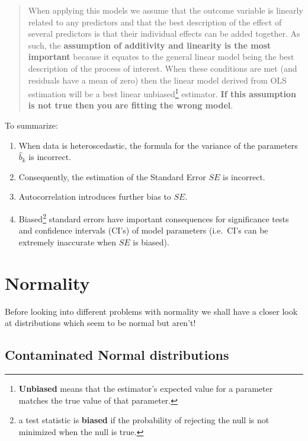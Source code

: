 \documentclass[
]{article}
\providecommand{\tightlist}{%
  \setlength{\itemsep}{0pt}\setlength{\parskip}{0pt}}
\begin{document}
\begin{quote}
When applying this models we assume that the outcome variable is linearly related to any predictors and that the best description of the effect of several predictors is that their individual effects can be added together. As such, the \textbf{assumption of additivity and linearity is the most important} because it equates to the general linear model being the best description of the process of interest. When these conditions are met (and residuals have a mean of zero) then the linear model derived from OLS estimation will be a best linear unbiased\footnote{ \textbf{Unbiased} means that the estimator's expected value for a parameter matches the true value of that parameter.} estimator. \textbf{If this assumption is not true then you are fitting the wrong model}.
\end{quote}

To summarize:

\begin{enumerate}
\def\labelenumi{\arabic{enumi}.}
\tightlist
\item
  When data is heteroscedastic, the formula for the variance of the parameters \(\hat{b}_k\) is incorrect.
\item
  Consequently, the estimation of the Standard Error \(SE\) is incorrect.
\item
  Autocorrelation introduces further bias to \(SE\).
\item
  Biased\footnote{ a test statistic is \textbf{biased} if the probability of rejecting the null is not minimized when the null is true.} standard errors have important consequences for significance tests and confidence intervals (CI's) of model parameters (i.e.~CI's can be extremely inaccurate when \(SE\) is biased).
\end{enumerate}

\section*{Normality}\label{normality}

Before looking into different problems with normality we shall have a closer look at distributions which seem to be normal but aren't!

\subsection*{Contaminated Normal distributions}\label{contaminated-normal-distributions}
\end{document}
